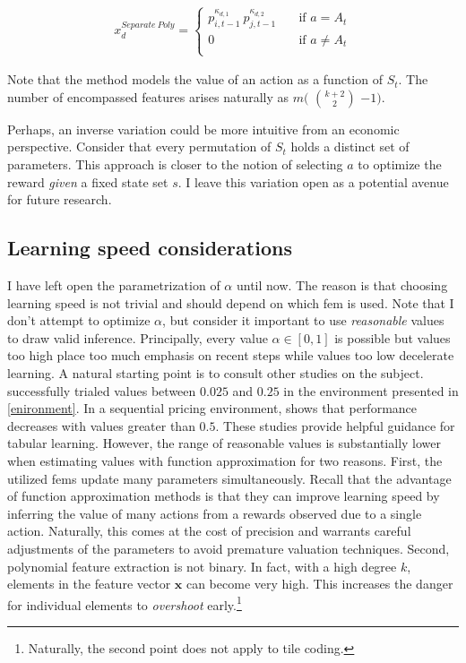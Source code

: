 \begin{gather}\label{separated_poly_extraction}
x_d^{Separate~Poly} = \begin{cases}
p_{i, t-1}^{\kappa_{d,1}} ~ p_{j, t-1}^{\kappa_{d,2}} & \quad \text{if } a = A_t  \\
0 & \quad \text{if } a \ne A_t \\ \end{cases} 
\end{gather}

Note that the method models the value of an action as a function of $S_t$. The number of encompassed features arises naturally as $m($ $k+2\choose2$ $-1)$.


Perhaps, an inverse variation could be more intuitive from an economic perspective. Consider that every permutation of $S_t$ holds a distinct set of parameters. This approach is closer to the notion of selecting $a$ to optimize the reward \emph{given} a fixed state set $s$. I leave this variation open as a potential avenue for future research.

\subsection{Learning speed considerations}\label{learning_speed_considerations}

I have left open the parametrization of $\alpha$ until now. The reason is that choosing learning speed is not trivial and should depend on which \gls{fem} is used. Note that I don't attempt to optimize $\alpha$, but consider it important to use \emph{reasonable} values to draw valid inference. Principally, every value $\alpha \in [0,1]$ is possible but values too high place too much emphasis on recent steps while values too low decelerate learning. A natural starting point is to consult other studies on the subject. \textcite{calvano_artificial_2020} successfully trialed values between  $0.025$ and $0.25$ in the environment presented in \autoref{enironment}. In a sequential pricing environment, \textcite{klein_autonomous_2019} shows that performance decreases with values greater than $0.5$. These studies provide helpful guidance for tabular learning. However, the range of reasonable values is substantially lower when estimating values with function approximation for two reasons. First, the utilized \gls{fem}s update many parameters simultaneously. Recall that the advantage of function approximation methods is that they can improve learning speed by inferring the value of many actions from a rewards observed due to a single action. Naturally, this comes at the cost of precision and warrants careful adjustments of the parameters to avoid premature valuation techniques. 
Second, polynomial feature extraction is not binary. In fact, with a high degree $k$, elements in the feature vector $\boldsymbol{x}$ can become very high. This increases the danger for individual elements to \emph{overshoot} early.\footnote{Naturally, the second point does not apply to tile coding.}

